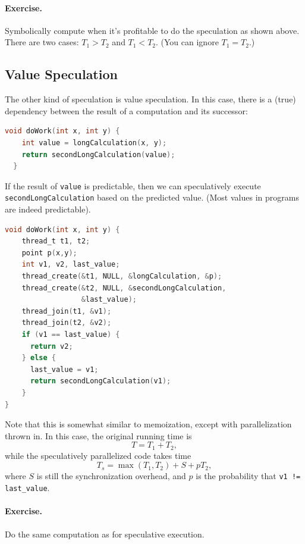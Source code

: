 \documentclass[a4paper]{report}
\begin{document}
\paragraph{Exercise.} Symbolically compute when it's profitable to do the
speculation as shown above. There are two cases: $T_1 > T_2$ and $T_1
< T_2$. (You can ignore $T_1 = T_2$.)


\subsection*{Value Speculation}
The other kind of speculation is value speculation. In this case,
there is a (true) dependency between the result of a computation 
and its successor:

{\small \begin{lstlisting}[language=C]
  void doWork(int x, int y) {
    int value = longCalculation(x, y);
    return secondLongCalculation(value);
  }
\end{lstlisting} }
If the result of {\tt value} is predictable, then we can speculatively
execute {\tt secondLongCalculation} based on the predicted value.
(Most values in programs are indeed predictable).
{\small \begin{lstlisting}[language=C]
void doWork(int x, int y) {
    thread_t t1, t2;
    point p(x,y);
    int v1, v2, last_value;
    thread_create(&t1, NULL, &longCalculation, &p);
    thread_create(&t2, NULL, &secondLongCalculation,
                  &last_value);
    thread_join(t1, &v1);
    thread_join(t2, &v2);
    if (v1 == last_value) {
      return v2;
    } else {
      last_value = v1;
      return secondLongCalculation(v1);
    }
}
\end{lstlisting}
}
Note that this is somewhat similar to memoization, except with 
parallelization thrown in. In this case, the original running time is
\[ T = T_1 + T_2, \]
while the speculatively parallelized code takes time
\[ T_s = \max(T_1, T_2) + S + pT_2,\]
where $S$ is still the synchronization overhead, and $p$ is the probability that
\verb+v1 != last_value+.

\paragraph{Exercise.} Do the same computation as for speculative execution.
\end{document}
